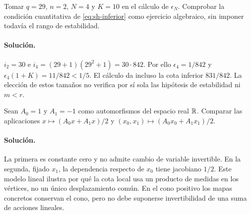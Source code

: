 \begin{ejercicio}
Tomar $q=29$, $n=2$, $N=4$ y $K=10$ en el cálculo de $\epsilon_N$. Comprobar la condición cuantitativa de \eqref{eq:sh-inferior} como ejercicio algebraico, sin imponer todavía el rango de estabilidad.
\end{ejercicio}
\paragraph{Solución.} $i_2=30$ e $i_4=(29+1)(29^2+1)=30\cdot842$. Por ello $\epsilon_4=1/842$ y $\epsilon_4(1+K)=11/842<1/5$. El cálculo da incluso la cota inferior $831/842$. La elección de estos tamaños no verifica por sí sola las hipótesis de estabilidad ni $m<r$.

\begin{ejercicio}
Sean $A_0=1$ y $A_1=-1$ como automorfismos del espacio real $\mathbb{R}$. Comparar las aplicaciones $x\mapsto(A_0x+A_1x)/2$ y $(x_0,x_1)\mapsto(A_0x_0+A_1x_1)/2$.
\end{ejercicio}
\paragraph{Solución.} La primera es constante cero y no admite cambio de variable invertible. En la segunda, fijado $x_1$, la dependencia respecto de $x_0$ tiene jacobiano $1/2$. Este modelo lineal ilustra por qué la cota local usa un producto de medidas en los vértices, no un único desplazamiento común. En el cono positivo los mapas concretos conservan el cono, pero no debe suponerse invertibilidad de una suma de acciones lineales.
